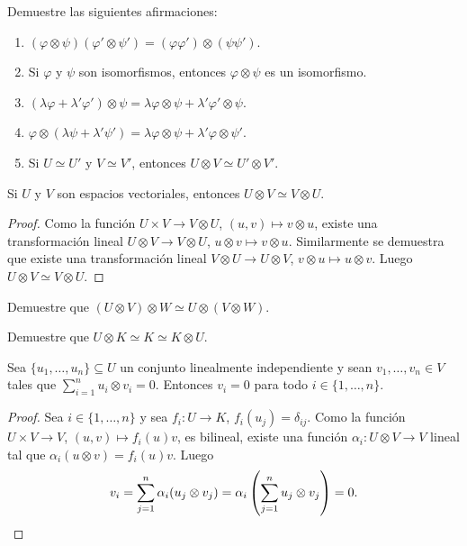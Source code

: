 \begin{exercise}
	Demuestre las siguientes afirmaciones:
	\begin{enumerate}
		\item $(\varphi\otimes\psi)(\varphi'\otimes\psi')=(\varphi\varphi')\otimes(\psi\psi')$.
		\item Si $\varphi$ y $\psi$ son isomorfismos, entonces
			$\varphi\otimes\psi$ es un isomorfismo. 
		\item $(\lambda\varphi+\lambda'\varphi')\otimes\psi=\lambda\varphi\otimes\psi+\lambda'\varphi'\otimes\psi$.
		\item $\varphi\otimes(\lambda\psi+\lambda'\psi')=\lambda\varphi\otimes\psi+\lambda'\varphi\otimes\psi'$.
		\item Si $U\simeq U'$ y $V\simeq V'$, entonces $U\otimes V\simeq U'\otimes V'$.
	\end{enumerate}
\end{exercise}

\begin{lemma}
	Si $U$ y $V$ son espacios vectoriales, entonces 
	$U\otimes V\simeq V\otimes U$.
\end{lemma}

\begin{proof}
	Como la función $U\times V\to V\otimes U$, $(u,v)\mapsto v\otimes u$,
	existe una transformación lineal $U\otimes V\to V\otimes U$, $u\otimes
	v\mapsto v\otimes u$. Similarmente se demuestra que existe una
	transformación lineal $V\otimes U\to U\otimes V$, $v\otimes u\mapsto
	u\otimes v$. Luego $U\otimes V\simeq V\otimes U$.
\end{proof}

\begin{exercise}
	\label{xca:UxVxW}
	Demuestre que $(U\otimes V)\otimes W\simeq U\otimes(V\otimes W)$.
\end{exercise}

\begin{exercise}
	\label{xca:UxK}
	Demuestre que $U\otimes K\simeq K\simeq K\otimes U$.
\end{exercise}

\begin{lemma}
	\label{lem:U_LI}
	Sea $\{u_1,\dots,u_n\}\subseteq U$ un conjunto linealmente independiente y
	sean $v_1,\dots,v_n\in V$ tales que $\sum_{i=1}^n u_i\otimes v_i=0$.
	Entonces $v_i=0$ para todo $i\in\{1,\dots,n\}$.
\end{lemma}

\begin{proof}
	Sea $i\in\{1,\dots,n\}$ y sea $f_i\colon U\to K$, $f_i(u_j)=\delta_{ij}$.
	Como la función $U\times V\to V$, $(u,v)\mapsto f_i(u)v$, es bilineal, existe una función
	$\alpha_i\colon U\otimes V\to V$ lineal tal que $\alpha_i(u\otimes
	v)=f_i(u)v$. Luego
	\[
		v_i=\sum_{j=1}^n\alpha_i(u_j\otimes v_j)=\alpha_i\left(\sum_{j=1}^nu_j\otimes v_j\right)=0.\qedhere
	\]
\end{proof}

